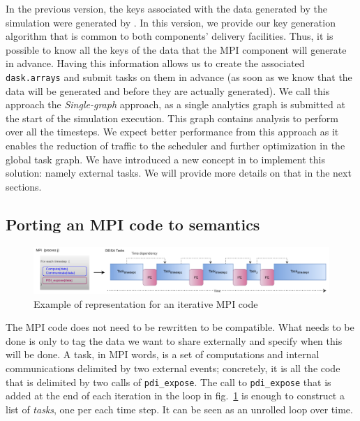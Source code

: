 In the previous version, the keys associated with the data generated by the simulation were generated by \dask. 
In this version, we provide our key generation algorithm that is common to both components' delivery facilities.   
Thus, it is possible to know all the keys of the data that the MPI component will generate in advance. 
Having this information allows us to create the associated \texttt{dask.arrays} and submit tasks on them in advance (as soon as we know that the data will be generated and before they are actually generated).
We call this approach the \textit{Single-graph} approach, as a single analytics graph is submitted at the start of the simulation execution. This graph contains analysis to perform over all the timesteps. We expect better performance from this approach as it enables the reduction of traffic to the scheduler and further optimization in the global task graph. 
We have introduced a new concept in \dask to implement this solution: namely external tasks. We will provide more details on that in the next sections.  

\subsection{Porting an MPI code to \deisa semantics}\label{sec:btp:porting}

\begin{figure}[tb]
\centerline{\includegraphics[width=\textwidth]{figures/deplierLoop.pdf}}
\caption{Example of \deisa representation for an iterative MPI code}
\label{figunroll}
\end{figure}

The MPI code does not need to be rewritten to be \deisa compatible. What needs to be done is only to tag the data we want to share externally and specify when this will be done. 
A \deisa task, in MPI words, is a set of computations and internal communications delimited by two external events; concretely, it is all the code that is delimited by two calls of \texttt{pdi\_expose}. 
The call to \texttt{pdi\_expose} that is added at the end of each iteration in the loop in fig.~\ref{figunroll} is enough to construct a list of \textit{\deisa tasks}, one per each time step. It can be seen as an unrolled loop over time.



